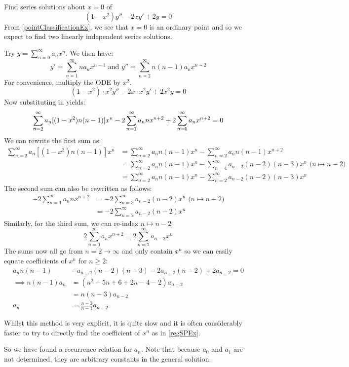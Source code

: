 \documentclass[../main.tex]{subfiles}
\begin{document}
\begin{example}
  Find series solutions about $x = 0$ of
  \[
    (1 - x^2)y'' - 2xy' + 2y = 0
  \]
  From \cref{pointClassificationEx}, we see that $x = 0$ is an ordinary point and so we expect to find two linearly independent series solutions.

  Try $y = \sum_{n=0}^{\infty} a_nx^{n}$.
  We then have:
  \[
    y' = \sum_{n = 1}^{\infty} na_nx^{n - 1} \text{ and }y'' = \sum_{n = 2}^{\infty} n(n-1)a_nx^{n - 2}
  \]
  For convenience, multiply the ODE by $x^2$.
  \[
    (1 - x^2)\cdot x^2y'' - 2x \cdot x^2 y' + 2x^2y = 0
  \]
  Now substituting in yields:
  \[
    \sum_{n = 2}^{\infty} a_n[(1 - x^2)n(n-1)]x^{n} - 2\sum_{n=1}^{\infty} a_n n x^{n + 2} + 2 \sum_{n = 0}^{\infty} a_n x^{n + 2} = 0 \\
  \]
  We can rewrite the first sum as:
  \begin{align*}
    \sum_{n = 2}^{\infty} a_n[(1 - x^2)n(n - 1)]x^{n} &= \sum_{n=2}^{\infty} a_n n(n-1)x^{n} - \sum_{n = 2}^{\infty} a_n n(n - 1)x^{n + 2} \\
                                                      &= \sum_{n = 2}^{\infty} a_n n(n - 1)x^{n} - \sum_{n = 4}^{\infty} a_{n - 2}(n - 2)(n - 3)x^{n} \text{ ($n \mapsto n - 2$)}\\
                                                      &=  \sum_{n = 2}^{\infty} a_n n(n - 1)x^{n} - \sum_{n = 2}^{\infty} a_{n - 2}(n - 2)(n - 3)x^{n}
  \end{align*}
  The second sum can also be rewritten as follows:
  \begin{align*}
    -2\sum_{n=1}^{\infty} a_n n x^{n + 2} &= -2 \sum_{n = 3}^{\infty} a_{n - 2}(n - 2)x^{n} \text{ ($n \mapsto n -2$)}\\
                                          &= -2 \sum_{n = 2}^{\infty} a_{n - 2}(n - 2)x^{n}
  \end{align*}
  Similarly, for the third sum, we can re-index $n \mapsto n - 2$
  \[
    2 \sum_{n=0}^{\infty} a_n x^{n + 2} = 2 \sum_{n=2}^{\infty} a_{n - 2}x^{n}
  \]
  The sums now all go from $n = 2 \to \infty$ and only contain $x^{n}$ so we can easily equate coefficients of $x^{n}$ for $n \geq 2$:
  \begin{align*}
    a_n n(n - 1)& - a_{n - 2}(n - 2)(n - 3) - 2 a_{n - 2}(n - 2) + 2a_{n - 2} = 0 \\
    \implies n(n - 1)a_n &= (n^2 - 5n + 6 + 2n - 4 - 2)a_{n - 2} \\
                &= n(n - 3)a_{n - 2} \\
    a_n &= \frac{n - 3}{n - 1}a_{n  - 2}
  \end{align*}
  \begin{remark}[Advice]
    Whilst this method is very explicit, it is quite slow and it is often considerably faster to try to directly find the coefficient of $x^{n}$ as in \cref{regSPEx}.
  \end{remark}
  So we have found a recurrence relation for $a_n$.
  Note that because $a_0$ and $a_1$ are not determined, they are arbitrary constants in the general solution.


\end{example}
\end{document}
